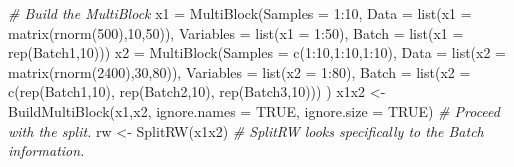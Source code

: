\documentclass[
]{book}
\newenvironment{Shaded}{\begin{snugshade}}{\end{snugshade}}
\newcommand{\AttributeTok}[1]{\textcolor[rgb]{0.77,0.63,0.00}{#1}}
\newcommand{\CommentTok}[1]{\textcolor[rgb]{0.56,0.35,0.01}{\textit{#1}}}
\newcommand{\ConstantTok}[1]{\textcolor[rgb]{0.00,0.00,0.00}{#1}}
\newcommand{\DecValTok}[1]{\textcolor[rgb]{0.00,0.00,0.81}{#1}}
\newcommand{\FunctionTok}[1]{\textcolor[rgb]{0.00,0.00,0.00}{#1}}
\newcommand{\NormalTok}[1]{#1}
\newcommand{\OtherTok}[1]{\textcolor[rgb]{0.56,0.35,0.01}{#1}}
\newcommand{\SpecialCharTok}[1]{\textcolor[rgb]{0.00,0.00,0.00}{#1}}
\newcommand{\StringTok}[1]{\textcolor[rgb]{0.31,0.60,0.02}{#1}}
\begin{document}
\begin{Shaded}
\begin{Highlighting}[]
\CommentTok{\# Build the MultiBlock}
\NormalTok{x1 }\OtherTok{=} \FunctionTok{MultiBlock}\NormalTok{(}\AttributeTok{Samples =} \DecValTok{1}\SpecialCharTok{:}\DecValTok{10}\NormalTok{,}
                \AttributeTok{Data =} \FunctionTok{list}\NormalTok{(}\AttributeTok{x1 =} \FunctionTok{matrix}\NormalTok{(}\FunctionTok{rnorm}\NormalTok{(}\DecValTok{500}\NormalTok{),}\DecValTok{10}\NormalTok{,}\DecValTok{50}\NormalTok{)),}
                \AttributeTok{Variables =} \FunctionTok{list}\NormalTok{(}\AttributeTok{x1 =} \DecValTok{1}\SpecialCharTok{:}\DecValTok{50}\NormalTok{),}
                \AttributeTok{Batch =} \FunctionTok{list}\NormalTok{(}\AttributeTok{x1 =} \FunctionTok{rep}\NormalTok{(}\StringTok{\textquotesingle{}Batch1\textquotesingle{}}\NormalTok{,}\DecValTok{10}\NormalTok{)))}
\NormalTok{x2 }\OtherTok{=} \FunctionTok{MultiBlock}\NormalTok{(}\AttributeTok{Samples =} \FunctionTok{c}\NormalTok{(}\DecValTok{1}\SpecialCharTok{:}\DecValTok{10}\NormalTok{,}\DecValTok{1}\SpecialCharTok{:}\DecValTok{10}\NormalTok{,}\DecValTok{1}\SpecialCharTok{:}\DecValTok{10}\NormalTok{),}
                \AttributeTok{Data =} \FunctionTok{list}\NormalTok{(}\AttributeTok{x2 =} \FunctionTok{matrix}\NormalTok{(}\FunctionTok{rnorm}\NormalTok{(}\DecValTok{2400}\NormalTok{),}\DecValTok{30}\NormalTok{,}\DecValTok{80}\NormalTok{)),}
                \AttributeTok{Variables =} \FunctionTok{list}\NormalTok{(}\AttributeTok{x2 =} \DecValTok{1}\SpecialCharTok{:}\DecValTok{80}\NormalTok{),}
                \AttributeTok{Batch =} \FunctionTok{list}\NormalTok{(}\AttributeTok{x2 =} \FunctionTok{c}\NormalTok{(}\FunctionTok{rep}\NormalTok{(}\StringTok{\textquotesingle{}Batch1\textquotesingle{}}\NormalTok{,}\DecValTok{10}\NormalTok{),}
                                    \FunctionTok{rep}\NormalTok{(}\StringTok{\textquotesingle{}Batch2\textquotesingle{}}\NormalTok{,}\DecValTok{10}\NormalTok{),}
                                    \FunctionTok{rep}\NormalTok{(}\StringTok{\textquotesingle{}Batch3\textquotesingle{}}\NormalTok{,}\DecValTok{10}\NormalTok{)))}
\NormalTok{                )}
\NormalTok{x1x2 }\OtherTok{\textless{}{-}} \FunctionTok{BuildMultiBlock}\NormalTok{(x1,x2, }\AttributeTok{ignore.names =} \ConstantTok{TRUE}\NormalTok{, }\AttributeTok{ignore.size =} \ConstantTok{TRUE}\NormalTok{)}
\CommentTok{\# Proceed with the split.}
\NormalTok{rw }\OtherTok{\textless{}{-}} \FunctionTok{SplitRW}\NormalTok{(x1x2) }\CommentTok{\# SplitRW looks specifically to the Batch information.}
\end{Highlighting}
\end{Shaded}
\end{document}
